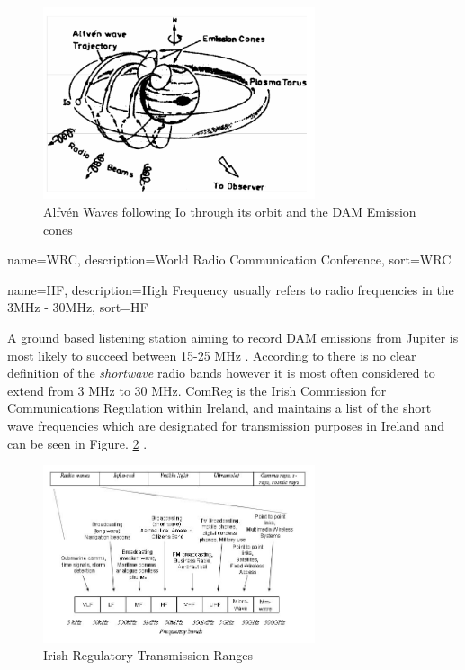 \documentclass[runningheads,a4paper]{llncs}
\begin{document}
%
\begin{figure}[here]
\centering
\includegraphics[width=8cm]{images/04}
\caption{Alfv\'en Waves following Io through its orbit and the DAM Emission cones \citep{bose08}}
\label{fig:io_plasma_torus}
\end{figure}
%

%
%
%

%
{
  name={WRC},
  description={World Radio Communication Conference},
  sort=WRC
}
%

%
{
  name={HF},
  description={High Frequency usually refers to radio frequencies in the 3MHz - 30MHz},
  sort=HF
}
%

A ground based listening station aiming to record \gls{DAM} emissions from Jupiter is most likely to succeed between 15-25 MHz \citep{wilkinson94}. According to \cite{arrl-00} there is no clear definition of the \textit{shortwave} radio bands however it is most often considered to extend from 3 MHz to 30 MHz. ComReg is the Irish Commission for Communications Regulation within Ireland, and maintains a list of the short wave frequencies which are designated for transmission purposes in Ireland and can be seen in Figure. \ref{fig:irish_electromagnetic_transmission_ranges} \citep{comreg14}.

%
\begin{figure}[here]
\centering
\includegraphics[width=8cm]{images/06}
\caption{Irish Regulatory Transmission Ranges \citep{comreg14}}
\label{fig:irish_electromagnetic_transmission_ranges}
\end{figure}
%
\end{document}
